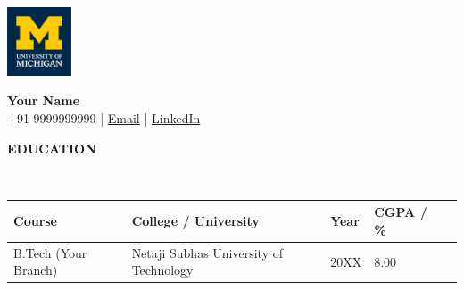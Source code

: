 \documentclass[11pt,article]{article}
\newcommand{\resheading}[1]{{\small \colorbox{mygrey} { \begin{minipage}{0.99\textwidth}{\textbf{#1 \vphantom{p\^{E}}}}\end{minipage}}}}
\begin{document}
\begin{table}
    \begin{minipage}{0\linewidth}
        \centering
        \includegraphics[height=0.8in]{U-M_Logo-Hex.png}
    \end{minipage}
    \begin{minipage}{1\linewidth}
        \centering
        \def\arraystretch{1}
        \textbf{\Large{Your Name}}\\ \vspace{0.4em}
        +91-9999999999 |
        \href{mailto:your.email@example.com}{Email} |
        \href{https://www.linkedin.com/in/}{LinkedIn}
    \end{minipage}\hfill
\end{table}
\setlength{\tabcolsep}{18pt}

\begin{table}
\centering
\resheading{\textbf{EDUCATION} }\\
\vspace{0.4em}
\begin{tabular}{lllll}
\textbf{Course}    & \textbf{College / University}     & \textbf{Year}     & \textbf{CGPA / \%} \\ 
\toprule
B.Tech (Your Branch)   & Netaji Subhas University of Technology  & 20XX   & 8.00 
\vspace{-0.8em}
\end{tabular}
\end{table}
\end{document}
